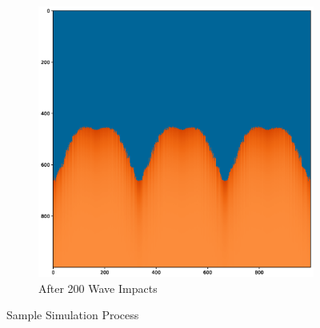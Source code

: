 \documentclass[12pt]{article}
\begin{document}
\begin{figure}[H]
\begin{subfigure}[c]{0.7\linewidth}
        \includegraphics[width=\linewidth]{Figure_2.eps}
        \caption{After 200 Wave Impacts}
    \end{subfigure}
    \label{fig:simulation_process}
    \caption{Sample Simulation Process}
\end{figure}
\end{document}
